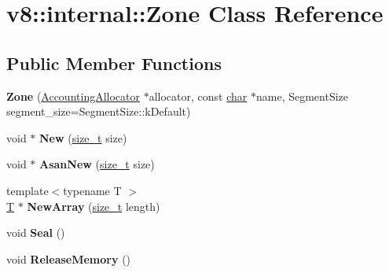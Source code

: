 \hypertarget{classv8_1_1internal_1_1Zone}{}\section{v8\+:\+:internal\+:\+:Zone Class Reference}
\label{classv8_1_1internal_1_1Zone}
\subsection*{Public Member Functions}
\begin{DoxyCompactItemize}
\item 
\mbox{\label{classv8_1_1internal_1_1Zone_a8fb6a99ca98823c602829f69db1462d2}} 
{\bfseries Zone} (\mbox{\hyperlink{classv8_1_1internal_1_1AccountingAllocator}{Accounting\+Allocator}} $\ast$allocator, const \mbox{\hyperlink{classchar}{char}} $\ast$name, Segment\+Size segment\+\_\+size=Segment\+Size\+::k\+Default)
\item 
\mbox{\label{classv8_1_1internal_1_1Zone_a7d3492d6524610364041fb21e62eb8cb}} 
void $\ast$ {\bfseries New} (\mbox{\hyperlink{classsize__t}{size\+\_\+t}} size)
\item 
\mbox{\label{classv8_1_1internal_1_1Zone_a1d4688f66d15aa955237f583791f6435}} 
void $\ast$ {\bfseries Asan\+New} (\mbox{\hyperlink{classsize__t}{size\+\_\+t}} size)
\item 
\mbox{\label{classv8_1_1internal_1_1Zone_ae8dd57543ca8ad136b47a99faad622dd}} 
{\footnotesize template$<$typename T $>$ }\\\mbox{\hyperlink{classv8_1_1internal_1_1torque_1_1T}{T}} $\ast$ {\bfseries New\+Array} (\mbox{\hyperlink{classsize__t}{size\+\_\+t}} length)
\item 
\mbox{\label{classv8_1_1internal_1_1Zone_a199eff98cf634a8ab8e8812847a36edc}} 
void {\bfseries Seal} ()
\item 
\mbox{\label{classv8_1_1internal_1_1Zone_a43c1a6b7b5953e7c1fbbc30f7e840263}} 
void {\bfseries Release\+Memory} ()
\item 
\mbox{\label{classv8_1_1internal_1_1Zone_a20777dcfc2efa6bd108be169f230ec4e}} 

\end{DoxyCompactItemize}
